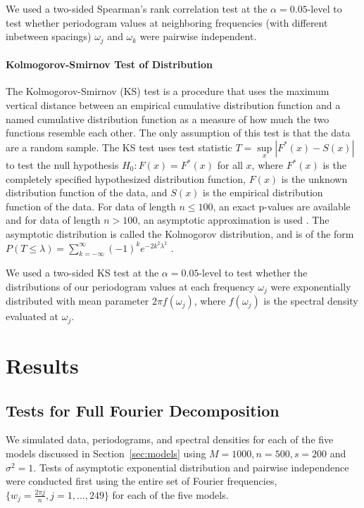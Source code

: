 \documentclass{article}\usepackage{graphicx, color}
\theoremstyle{plain}
\begin{document}
We used a two-sided Spearman's rank correlation test at the $\alpha = 0.05$-level to test whether periodogram values at neighboring frequencies (with different inbetween spacings) $\omega_j$ and $\omega_k$ were pairwise independent.


\paragraph{Kolmogorov-Smirnov Test of Distribution}
The Kolmogorov-Smirnov (KS) test is a procedure that uses the maximum vertical distance between an empirical cumulative distribution function and a named cumulative distribution function as a measure of how much the two functions resemble each other. The only assumption of this test is that the data are a random sample. The KS test uses test statistic $T = \sup\limits_x |F^*(x) - S(x)|$ to test the null hypothesis $H_0: F(x) = F^*(x)$ for all $x$, where $F^*(x)$ is the completely specified hypothesized distribution function, $F(x)$ is the unknown distribution function of the data, and $S(x)$ is the empirical distribution function of the data. For data of length $n \le 100$, an exact p-values are available and for data of length $n > 100$, an asymptotic approximation is used \cite{conover1998practical}. The asymptotic distribution is called the Kolmogorov distribution, and is of the form $P(T \le \lambda) = \sum_{k=-\infty}^\infty (-1)^k e^{-2k^2 \lambda^2}$ \cite{kolmogorov1992empirical}.

We used a two-sided KS test at the $\alpha = 0.05$-level to test whether the distributions of our periodogram values at each frequency $\omega_j$ were exponentially distributed with mean parameter $2\pi f(\omega_j)$, where $f(\omega_j)$ is the spectral density evaluated at $\omega_j$.




\section{Results}




\subsection{Tests for Full Fourier Decomposition}

We simulated data, periodograms, and spectral densities for each of the five models discussed in Section~\ref{sec:models} using $M=1000, n=500, s=200$ and $\sigma^2=1$. Tests of asymptotic exponential distribution and pairwise independence were conducted first using the entire set of Fourier frequencies, $\{w_j = \frac{2\pi j}{n}, j=1,...,249\}$ for each of the five models.
\end{document}
